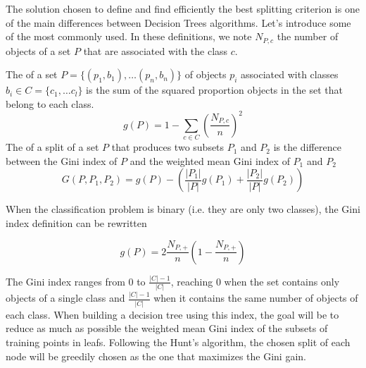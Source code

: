 The solution chosen to define and find efficiently the best splitting criterion is one of the main differences between Decision Trees algorithms. Let's introduce some of the most commonly used. In these definitions, we note $N_{P, c}$ the number of objects of a set $P$ that are associated with the class $c$.

\begin{definition}
    The  of a set $P = \{(p_1, b_1), \dots\allowbreak (p_n, b_n)\}$ of objects $p_i$ associated with classes $b_i \in C = \{c_1, \dots c_l\}$ is the sum of the squared proportion objects in the set that belong to each class.
    \begin{equation}
        g(P) = 1 - \sum_{c \in C} \left(\frac{N_{P, c}}{n}\right)^2
    \end{equation}
    The  of a split of a set $P$ that produces two subsets $P_1$ and $P_2$ is the difference between the Gini index of $P$ and the weighted mean Gini index of $P_1$ and $P_2$
    \begin{equation}
        G(P, P_1, P_2) = g(P) - \left(\frac{|P_1|}{|P|} g(P_1) + \frac{|P_2|}{|P|} g(P_2)\right)
    \end{equation}
\end{definition}

When the classification problem is binary (i.e. they are only two classes), the Gini index definition can be rewritten

\begin{equation}
    g(P) = 2 \frac{N_{P, +}}{n} \left(1 - \frac{N_{P, +}}{n}\right)
\end{equation}

The Gini index ranges from $0$ to $\frac{|C| - 1}{|C|}$, reaching $0$ when the set contains only objects of a single class and $\frac{|C| - 1}{|C|}$ when it contains the same number of objects of each class. When building a decision tree using this index, the goal will be to reduce as much as possible the weighted mean Gini index of the subsets of training points in leafs. Following the Hunt's algorithm, the chosen split of each node will be greedily chosen as the one that maximizes the Gini gain.

